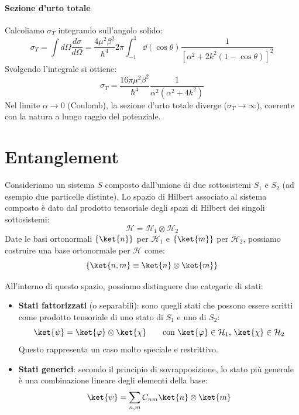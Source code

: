 \begin{example}
    \paragraph{Sezione d'urto totale}
    Calcoliamo \( \sigma_T \) integrando sull'angolo solido:
    \[
        \sigma_T = \int d\Omega \frac{d\sigma}{d\Omega} = \frac{4\mu^2 \beta^2}{\hbar^4} 2\pi \int_{-1}^{1} \dd(\cos\theta) \frac{1}{[\alpha^2 + 2k^2(1-\cos\theta)]^2}
    \]
    Svolgendo l'integrale si ottiene:
    \[
        \sigma_T = \frac{16\pi \mu^2 \beta^2}{\hbar^4} \frac{1}{\alpha^2(\alpha^2 + 4k^2)}
    \]
    Nel limite \( \alpha \to 0 \) (Coulomb), la sezione d'urto totale diverge (\( \sigma_T \to \infty \)), coerente con la natura a lungo raggio del potenziale.
\end{example}

\section{Entanglement}

Consideriamo un sistema \( S \) composto dall'unione di due sottosistemi \( S_1 \) e \( S_2 \) (ad esempio due particelle distinte).
Lo spazio di Hilbert associato al sistema composto è dato dal prodotto tensoriale degli spazi di Hilbert dei singoli sottosistemi:
\[
    \mathcal{H} = \mathcal{H}_1 \otimes \mathcal{H}_2
\]
Date le basi ortonormali \( \{\ket{n}\} \) per \( \mathcal{H}_1 \) e \( \{\ket{m}\} \) per \( \mathcal{H}_2 \), possiamo costruire una base ortonormale per \( \mathcal{H} \) come:
\[
    \left\{ \ket{n,m} \equiv \ket{n} \otimes \ket{m} \right\}
\]

All'interno di questo spazio, possiamo distinguere due categorie di stati:

\begin{itemize}
    \item \textbf{Stati fattorizzati} (o separabili): sono quegli stati che possono essere scritti come prodotto tensoriale di uno stato di \( S_1 \) e uno di \( S_2 \):
    \[
        \ket{\psi} = \ket{\varphi} \otimes \ket{\chi} \qquad \text{con } \ket{\varphi} \in \mathcal{H}_1, \, \ket{\chi} \in \mathcal{H}_2
    \]
    Questo rappresenta un caso molto speciale e restrittivo.

    \item \textbf{Stati generici}: secondo il principio di sovrapposizione, lo stato più generale è una combinazione lineare degli elementi della base:
    \[
        \ket{\psi} = \sum_{n,m} C_{nm} \ket{n} \otimes \ket{m}
    \]
\end{itemize}

